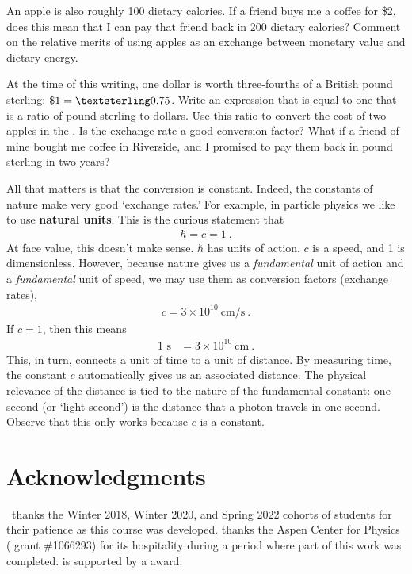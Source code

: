 \documentclass[12pt]{article}
\begin{document}
\begin{exercise} An apple is also roughly 100 dietary calories. If a friend buys me a coffee for \$2, does this mean that I can pay that friend back in 200 dietary calories? Comment on the relative merits of using apples as an exchange between monetary value and dietary energy.
\end{exercise}

\begin{exercise}
At the time of this writing, one dollar is worth three-fourths of a British pound sterling: $\$1 = \textsterling0.75$. Write an expression that is equal to one that is a ratio of pound sterling to dollars. Use this ratio to convert the cost of two apples in the . Is the exchange rate a good conversion factor? What if a friend of mine bought me coffee in Riverside, and I promised to pay them back in pound sterling in two years? 
\end{exercise}


All that matters is that the conversion is constant. Indeed, the constants of nature make very good `exchange rates.' For example, in particle physics we like to use \textbf{natural units}. This is the curious statement that
\begin{align}
  \hbar = c = 1 \ .
\end{align}
At face value, this doesn’t make sense. $\hbar$ has units of action, $c$ is a speed, and 1 is dimensionless. However, because nature gives us a \emph{fundamental} unit of action and a \emph{fundamental} unit of speed, we may use them as conversion factors (exchange rates),
\begin{align}
  c = 3 \times 10^{10}~\text{cm}/\text{s} \ .
\end{align}
If $c=1$, then this means
\begin{align}
  1 \text{ s} &=  3 \times 10^{10}~\text{cm} \ .
\end{align}
This, in turn, connects a unit of time to a unit of distance. By measuring time, the constant $c$ automatically gives us an associated distance. The physical relevance of the distance is tied to the nature of the fundamental constant: one second (or `light-second') is the distance that a photon travels in one second. Observe that this only works because $c$ is a constant. 





 \section*{Acknowledgments}


\ thanks the Winter 2018, Winter 2020, and Spring 2022 cohorts of students for their patience as this course was developed. 
%
 thanks the Aspen Center for Physics ( grant \#1066293) for its hospitality during a period where part of this work was completed. 
%
 is supported by a  award.



% 
\end{document}
